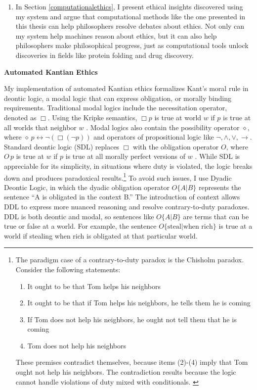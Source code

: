 \begin{isabellebody}
\begin{isamarkuptext}
\begin{enumerate}
\item In Section \ref{computationalethics}, I present ethical insights discovered using my system and argue that
computational methods like the one presented in this thesis can help philosophers resolve debates about ethics.
Not only can my system help machines reason about ethics, but it can also help philosophers make philosophical
progress, just as computational tools unlock discoveries in fields like protein folding and drug discovery.
\end{enumerate}%
\end{isamarkuptext}\isamarkuptrue%
%
\begin{isamarkuptext}%
\noindent \textbf{Automated Kantian Ethics}

\medskip 

My implementation of automated Kantian ethics formalizes Kant's moral rule
in deontic logic, a modal logic that can express obligation, or morally binding requirements. Traditional modal 
logics include the necessitation operator, denoted as $\Box$. Using the Kripke semantics, 
$\Box p$ is true at world $w$ if $p$ is true at all worlds that neighbor $w$ \citep{cresswell}. Modal 
logics  also contain the possibility operator $\diamond$, where $\diamond \, p \longleftrightarrow \neg (\Box (\neg p))$ 
and operators of propositional logic like $\neg, \wedge, \vee, \rightarrow$. Standard deontic logic (SDL) 
replaces $\Box$ with the obligation operator $O$, where $O \, p$ is true at $w$ 
if $p$ is true at all morally perfect versions of $w$ \citep{sep-logic-deontic}. While SDL is appreciable for its simplicity, 
in situations where duty is violated, the logic breaks down and produces paradoxical results.\footnote{The 
paradigm case of a contrary-to-duty paradox is the 
Chisholm paradox. Consider the following statements: \begin{enumerate}
\item It ought to be that Tom helps his neighbors
\item It ought to be that if Tom helps his neighbors, he tells them he is coming
\item If Tom does not help his neighbors, he ought not tell them that he is coming
\item Tom does not help his neighbors
\end{enumerate} 
These premises contradict themselves, because items (2)-(4) imply that Tom ought not help his neighbors. The 
contradiction results because the logic cannot handle violations of duty mixed with
conditionals. \citep{chisholm, ctd}
} To avoid such issues, I use Dyadic Deontic Logic, in which
the dyadic obligation operator $O\{A \vert B\}$ represents the sentence ``A is obligated in the context B.'' 
The introduction of context allows DDL to express more nuanced reasoning and resolve contrary-to-duty
paradoxes. DDL is both deontic and modal, 
so sentences like $O\{A \vert B\}$ are terms that can be true or false at a world. For example, the 
sentence $O \{ \text{steal} \vert \text{when rich}\}$ is true at a world if stealing when rich is 
obligated at that particular world. 


\end{isamarkuptext}
\end{isabellebody}
